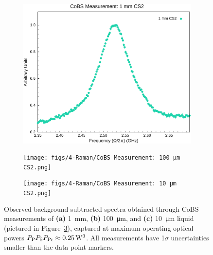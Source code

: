 \begin{figure}[h!]
  \centering
  \begin{subfigure}[b]{0.48\textwidth}
    \centering
    \includegraphics[width=\textwidth]{figs/4-Raman/CoBS Measurement: 1 mm CS2.png}
    \caption{}
    \label{fig:Raman:1mmCS2}
  \end{subfigure}
  \hfill
  \begin{subfigure}[b]{0.48\textwidth}
    \centering
    \texttt{[image: figs/4-Raman/CoBS Measurement: 100 μm CS2.png]}
    \caption{}
    \label{fig:Raman:100umCS2}
  \end{subfigure}
  \vspace{1em}
  \begin{subfigure}[b]{0.48\textwidth}
    \centering
    \texttt{[image: figs/4-Raman/CoBS Measurement: 10 μm CS2.png]}
    \caption{}
    \label{fig:Raman:10umCS2}
  \end{subfigure}
  \caption[Observed spectra obtained through a \acs{CoBS} measurement of \SI{1}{\milli\meter}, \SI{100}{\micro\meter}, and \SI{10}{\micro\meter} liquid .]{Observed background-subtracted spectra obtained through \ac{CoBS} measurements of \textbf{(a)} \SI{1}{\milli\meter}, \textbf{(b)} \SI{100}{\micro\meter}, and \textbf{(c)} \SI{10}{\micro\meter} liquid  (pictured in Figure~\ref{fig:Raman:10umCS2}), captured at maximum operating optical powers \(P_{\rm P}P_{\rm S}P_{\rm Pr} \approx \SI{0.25}{\cubic\watt}\). All measurements have 1\(\sigma\) uncertainties smaller than the data point markers.}
  \label{fig:Raman:CS2combined}
\end{figure}


